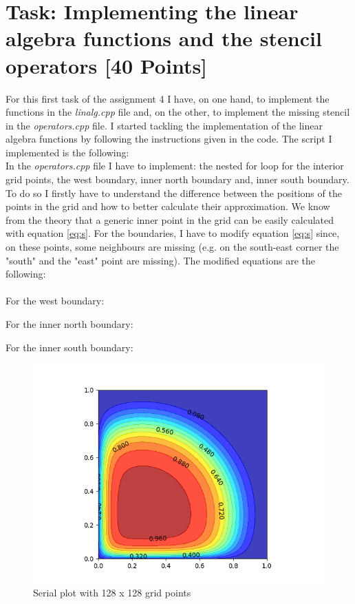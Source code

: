 \documentclass[unicode,11pt,a4paper,oneside,numbers=endperiod,openany]{scrartcl}
\begin{document}
\section{Task: Implementing the linear algebra functions and the stencil operators [40 Points]}
For this first task of the assignment 4 I have, on one hand, to implement the functions in the \textit{linalg.cpp} file and, on the other, to implement the missing stencil in the \textit{operators.cpp} file. I started tackling the implementation of the linear algebra functions by following the instructions given in the code. The script I implemented is the following:\\


In the \textit{operators.cpp} file I have to implement: the nested for loop for the interior grid points, the west boundary, inner north boundary and, inner south boundary. To do so I firstly have to understand the difference between the positions of the points in the grid and how to better calculate their approximation. We know from the theory that a generic inner point in the grid can be easily calculated with equation \ref{eq:s}. For the boundaries, I have to modify equation \ref{eq:s} since, on these points, some neighbours are missing (e.g. on the south-east corner the "south" and the "east" point are missing). The modified equations are the following:\\ \\For the west boundary:
    
For the inner north boundary:
 
For the inner south boundary:


\begin{figure}[h!]
\centering
\includegraphics[width=\textwidth]{Figures/serialFig.png}
\caption{Serial plot with 128 x 128 grid points}\label{fig:serialPlot}
\end{figure}
\end{document}
